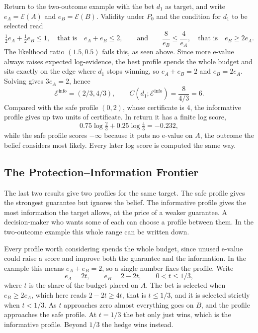 Return to the two-outcome example with the bet $d_1$ as target, and write
$e_A=\mathcal E(A)$ and $e_B=\mathcal E(B)$. Validity under $P_0$ and the
condition for $d_1$ to be selected read
\[
  \tfrac12e_A+\tfrac12e_B\leq1,
  \quad\text{that is}\quad e_A+e_B\leq2,
  \qquad\text{and}\qquad
  \frac{8}{e_B}\leq\frac{4}{e_A},
  \quad\text{that is}\quad e_B\geq2e_A.
\]
The likelihood ratio $(1.5,0.5)$ fails this, as seen above. Since more
e-value always raises expected log-evidence, the best profile spends the whole
budget and sits exactly on the edge where $d_1$ stops winning, so
$e_A+e_B=2$ and $e_B=2e_A$. Solving gives $3e_A=2$, hence
\[
  \mathcal E^{\mathrm{info}}=(2/3,4/3),
  \qquad
  C(d_1;\mathcal E^{\mathrm{info}})=\frac{8}{4/3}=6.
\]
Compared with the safe profile $(0,2)$, whose certificate is $4$, the
informative profile gives up two units of certificate. In return it has a
finite log score,
\[
  0.75\log\tfrac23+0.25\log\tfrac43=-0.232,
\]
while the safe profile scores $-\infty$ because it puts no e-value on $A$, the outcome the
belief considers most likely. Every later log score is computed the same way.

\subsection{The Protection--Information Frontier}\label{sec:frontier}

The last two results give two profiles for the same target. The safe profile
gives the strongest guarantee but ignores the belief. The informative profile
gives the most information the target allows, at the price of a weaker
guarantee. A decision-maker who wants some of each can choose a profile
between them. In the two-outcome example this whole range can be written
down.

Every profile worth considering spends the whole budget, since unused
e-value could raise a score and improve both the guarantee and the
information. In the example this means $e_A+e_B=2$, so a single number fixes
the profile. Write
\begin{equation}
  e_A=2t,\qquad e_B=2-2t,
  \qquad 0<t\leq1/3,
  \label{eq:frontier}
\end{equation}
where $t$ is the share of the budget placed on $A$. The bet is selected when
$e_B\geq2e_A$, which here reads $2-2t\geq4t$, that is $t\leq1/3$, and it is
selected strictly when $t<1/3$. As $t$ approaches zero almost everything goes
on $B$, and the profile approaches the safe profile. At $t=1/3$ the bet only
just wins, which is the informative profile. Beyond $1/3$ the hedge wins
instead.

